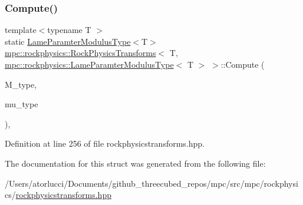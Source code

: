 \subsubsection{\texorpdfstring{Compute()}{Compute()}\hspace{0.1cm}{\footnotesize\ttfamily [7/7]}}
{\footnotesize\ttfamily template$<$typename T $>$ \\
static \mbox{\hyperlink{structmpc_1_1rockphysics_1_1_lame_paramter_modulus_type}{Lame\+Paramter\+Modulus\+Type}}$<$T$>$ \mbox{\hyperlink{structmpc_1_1rockphysics_1_1_rock_physics_transforms}{mpc\+::rockphysics\+::\+Rock\+Physics\+Transforms}}$<$ T, \mbox{\hyperlink{structmpc_1_1rockphysics_1_1_lame_paramter_modulus_type}{mpc\+::rockphysics\+::\+Lame\+Paramter\+Modulus\+Type}}$<$ T $>$ $>$\+::Compute (\begin{DoxyParamCaption}\item[{const \mbox{\hyperlink{structmpc_1_1rockphysics_1_1_compressional_modulus_type}{mpc\+::rockphysics\+::\+Compressional\+Modulus\+Type}}$<$ T $>$ \&}]{M\+\_\+type,  }\item[{const \mbox{\hyperlink{structmpc_1_1rockphysics_1_1_shear_modulus_type}{mpc\+::rockphysics\+::\+Shear\+Modulus\+Type}}$<$ T $>$ \&}]{mu\+\_\+type }\end{DoxyParamCaption})\hspace{0.3cm}{\ttfamily [inline]}, {\ttfamily [static]}}



Definition at line 256 of file rockphysicstransforms.\+hpp.



The documentation for this struct was generated from the following file\+:\begin{DoxyCompactItemize}
\item 
/\+Users/atorlucci/\+Documents/github\+\_\+threecubed\+\_\+repos/mpc/src/mpc/rockphysics/\mbox{\hyperlink{rockphysicstransforms_8hpp}{rockphysicstransforms.\+hpp}}\end{DoxyCompactItemize}
